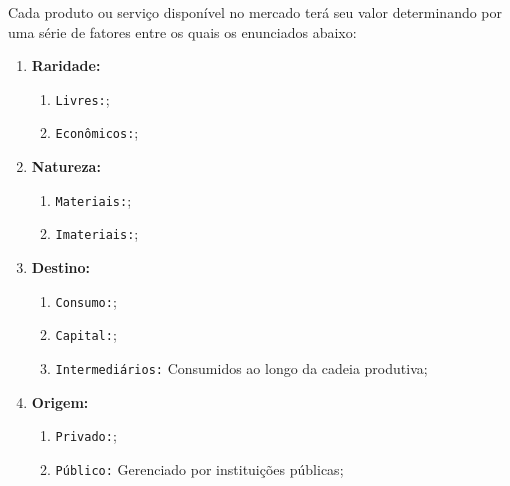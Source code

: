 \documentclass{article}
\begin{document}
            Cada produto ou serviço disponível no mercado terá seu valor determinando por uma série de fatores entre os quais os enunciados abaixo:
                \begin{enumerate}
                    \item \textbf{Raridade:}
                        \begin{enumerate}[noitemsep]
                            \item \texttt{Livres:};
                            \item \texttt{Econômicos:};
                        \end{enumerate}

                    \item \textbf{Natureza:}
                        \begin{enumerate}[noitemsep]
                            \item \texttt{Materiais:};
                            \item \texttt{Imateriais:};
                        \end{enumerate}

                    \item \textbf{Destino:}
                        \begin{enumerate}[noitemsep]
                            \item \texttt{Consumo:};
                            \item \texttt{Capital:};
                            \item \texttt{Intermediários:} Consumidos ao longo da cadeia produtiva;
                        \end{enumerate}

                    \item \textbf{Origem:}
                        \begin{enumerate}[noitemsep]
                            \item \texttt{Privado:};
                            \item \texttt{Público:} Gerenciado por instituições públicas;
                        \end{enumerate}
                \end{enumerate}
\end{document}
